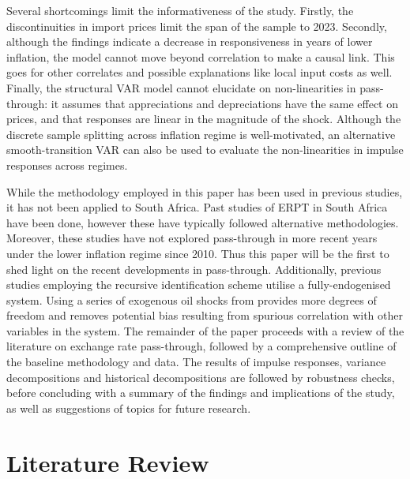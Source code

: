 \documentclass[12pt]{article}
\begin{document}
Several shortcomings limit the informativeness of the study. Firstly, the discontinuities in import prices limit the span of the sample to 2023. Secondly, although the findings indicate a decrease in responsiveness in years of lower inflation, the model cannot move beyond correlation to make a causal link. This goes for other correlates and possible explanations like local input costs as well. Finally, the structural VAR model cannot elucidate on non-linearities in pass-through: it assumes that appreciations and depreciations have the same effect on prices, and that responses are linear in the magnitude of the shock. Although the discrete sample splitting across inflation regime is well-motivated, an alternative smooth-transition VAR can also be used to evaluate the non-linearities in impulse responses across regimes. 

While the methodology employed in this paper has been used in previous studies, it has not been applied to South Africa. Past studies of ERPT in South Africa have been done, however these have typically followed alternative methodologies. Moreover, these studies have not explored pass-through in more recent years under the lower inflation regime since 2010. Thus this paper will be the first to shed light on the recent developments in pass-through. Additionally, previous studies employing the recursive identification scheme utilise a fully-endogenised system. Using a series of exogenous oil shocks from \textcite{Kanzig} provides more degrees of freedom and removes potential bias resulting from spurious correlation with other variables in the system. The remainder of the paper proceeds with a review of the literature on exchange rate pass-through, followed by a comprehensive outline of the baseline methodology and data. The results of impulse responses, variance decompositions and historical decompositions are followed by robustness checks, before concluding with a summary of the findings and implications of the study, as well as suggestions of topics for future research.


\pagebreak
\section{Literature Review}
\end{document}
